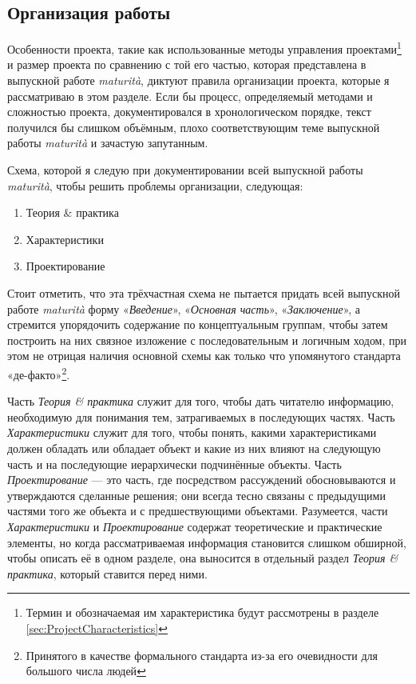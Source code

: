 \documentclass[a4paper, 10pt, final]{article} %
\begin{document}
    \subsection{Организация работы}\label{sec:IntroOrganization}
    Особенности проекта, такие как использованные методы управления проектами\footnote{Термин и обозначаемая им характеристика будут рассмотрены в разделе \ref{sec:ProjectCharacteristics}} и размер проекта по сравнению с той его частью, которая представлена в выпускной работе \emph{maturit\`{a}}, диктуют правила организации проекта, которые я рассматриваю в этом разделе.
    Если бы процесс, определяемый методами и сложностью проекта, документировался в хронологическом порядке, текст получился бы слишком объёмным, плохо соответствующим теме выпускной работы \emph{maturit\`{a}} и зачастую запутанным.
    
    \begin{samepage}
        \noindent Схема, которой я следую при документировании всей выпускной работы \emph{maturit\`{a}}, чтобы решить проблемы организации, следующая:
        \begin{enumerate}[label=\emph{(\roman*)}]
            \item Теория \& практика
            \item Характеристики
            \item Проектирование
        \end{enumerate}
    \end{samepage}
    Стоит отметить, что эта трёхчастная схема не пытается придать всей выпускной работе \emph{maturit\`{a}} форму «\emph{Введение}», «\emph{Основная часть}», «\emph{Заключение}», а стремится упорядочить содержание по концептуальным группам, чтобы затем построить на них связное изложение с последовательным и логичным ходом, при этом не отрицая наличия основной схемы как только что упомянутого стандарта «де-факто»\footnote{Принятого в качестве формального стандарта из-за его очевидности для большого числа людей}.
    
    Часть \emph{Теория \& практика} служит для того, чтобы дать читателю информацию, необходимую для понимания тем, затрагиваемых в последующих частях.
    Часть \emph{Характеристики} служит для того, чтобы понять, какими характеристиками должен обладать или обладает объект и какие из них влияют на следующую часть и на последующие иерархически подчинённые объекты.
    Часть \emph{Проектирование} --- это часть, где посредством рассуждений обосновываются и утверждаются сделанные решения; они всегда тесно связаны с предыдущими частями того же объекта и с предшествующими объектами.
    Разумеется, части \emph{Характеристики} и \emph{Проектирование} содержат теоретические и практические элементы, но когда рассматриваемая информация становится слишком обширной, чтобы описать её в одном разделе, она выносится в отдельный раздел \emph{Теория \& практика}, который ставится перед ними.
    
\end{document}

